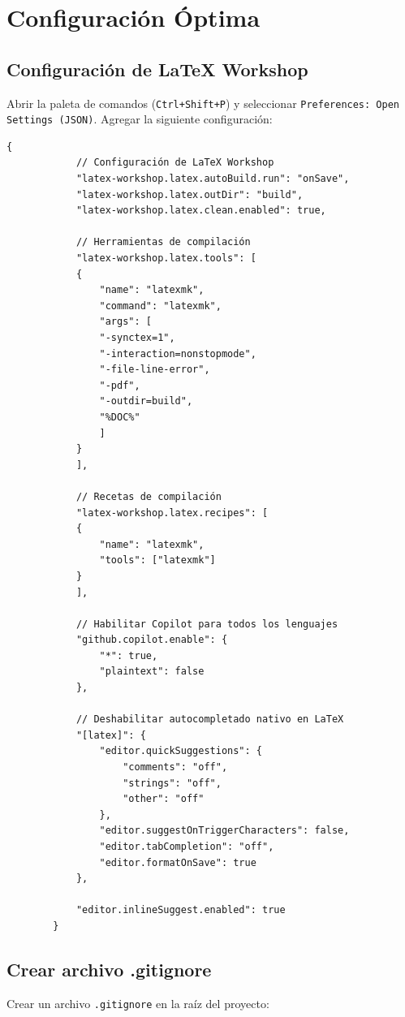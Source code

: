 \documentclass[11pt,a4paper]{article}
\newcommand{\codigo}[1]{\texttt{\textcolor{codigo}{#1}}}
\newcommand{\comando}[1]{\textcolor{azulprofundo}{\texttt{#1}}}
\begin{document}
	
	\section{Configuración Óptima}
	
	\subsection{Configuración de LaTeX Workshop}
	
	Abrir la paleta de comandos (\comando{Ctrl+Shift+P}) y seleccionar \codigo{Preferences: Open Settings (JSON)}. Agregar la siguiente configuración:
	
	\begin{lstlisting}[caption=Configuración de settings.json]
		{
			// Configuración de LaTeX Workshop
			"latex-workshop.latex.autoBuild.run": "onSave",
			"latex-workshop.latex.outDir": "build",
			"latex-workshop.latex.clean.enabled": true,
			
			// Herramientas de compilación
			"latex-workshop.latex.tools": [
			{
				"name": "latexmk",
				"command": "latexmk",
				"args": [
				"-synctex=1",
				"-interaction=nonstopmode",
				"-file-line-error",
				"-pdf",
				"-outdir=build",
				"%DOC%"
				]
			}
			],
			
			// Recetas de compilación
			"latex-workshop.latex.recipes": [
			{
				"name": "latexmk",
				"tools": ["latexmk"]
			}
			],
			
			// Habilitar Copilot para todos los lenguajes
			"github.copilot.enable": {
				"*": true,
				"plaintext": false
			},
			
			// Deshabilitar autocompletado nativo en LaTeX
			"[latex]": {
				"editor.quickSuggestions": {
					"comments": "off",
					"strings": "off",
					"other": "off"
				},
				"editor.suggestOnTriggerCharacters": false,
				"editor.tabCompletion": "off",
				"editor.formatOnSave": true
			},
			
			"editor.inlineSuggest.enabled": true
		}
	\end{lstlisting}
	
	\subsection{Crear archivo .gitignore}
	
	Crear un archivo \codigo{.gitignore} en la raíz del proyecto:
	
\end{document}
